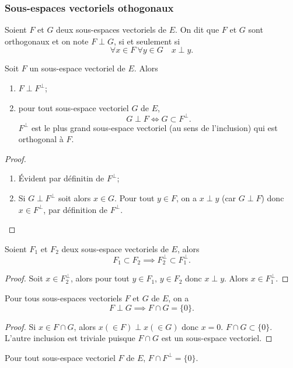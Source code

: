 \subsubsection{Sous-espaces vectoriels othogonaux}

\begin{defdef}
  Soient \(F\) et \(G\) deux sous-espaces vectoriels de \(E\). On dit que \(F\) et \(G\) sont orthogonaux et on note \(F \perp G\), si et seulement si
  \begin{equation}
    \forall x \in F \ \forall y \in G \quad x \perp y.
  \end{equation}
\end{defdef}
\begin{prop}
  Soit \(F\) un sous-espace vectoriel de \(E\). Alors
  \begin{enumerate}
  \item \(F \perp F^\perp\);
  \item pour tout sous-espace vectoriel \(G\) de \(E\),
    \begin{equation}
      G \perp F \iff G \subset F^\perp.
    \end{equation}
    \(F^\perp\) est le plus grand sous-espace vectoriel (au sens de l'inclusion) qui est orthogonal à \(F\).
  \end{enumerate}
\end{prop}
\begin{proof}
  \begin{enumerate}
  \item Évident par définitin de \(F^\perp\);
  \item Si \(G \perp F^\perp\) soit alors \(x \in G\). Pour tout \(y \in F\), on a \(x \perp y\) (car \(G \perp F\)) donc \(x \in F^\perp\), par définition de \(F^\perp\).
  \end{enumerate}
\end{proof}
\begin{prop}
  Soient \(F_1\) et \(F_2\) deux sous-espace vectoriels de \(E\), alors
  \begin{equation}
    F_1 \subset F_2 \implies F_2^\perp \subset F_1^\perp.
  \end{equation}
\end{prop}
\begin{proof}
  Soit \(x \in F_2^\perp\), alors pour tout \(y \in F_1\), \(y \in F_2\) donc \(x \perp y\). Alors \(x \in F_1^\perp\).
\end{proof}
\begin{prop}
  Pour tous sous-espaces vectoriels \(F\) et \(G\) de \(E\), on a
  \begin{equation}
    F \perp G \implies F \cap G = \{0\}.
  \end{equation}
\end{prop}
\begin{proof}
  Si \(x \in F \cap G\), alors \(x (\in F) \perp x (\in G)\) donc \(x=0\).  \(F \cap G \subset \{0\}\). L'autre inclusion est triviale puisque \(F \cap G\) est un sous-espace vectoriel.
\end{proof}
\begin{cor}
  Pour tout sous-espace vectoriel \(F\) de \(E\), \(F \cap F^\perp =\{0\}\).
\end{cor}

